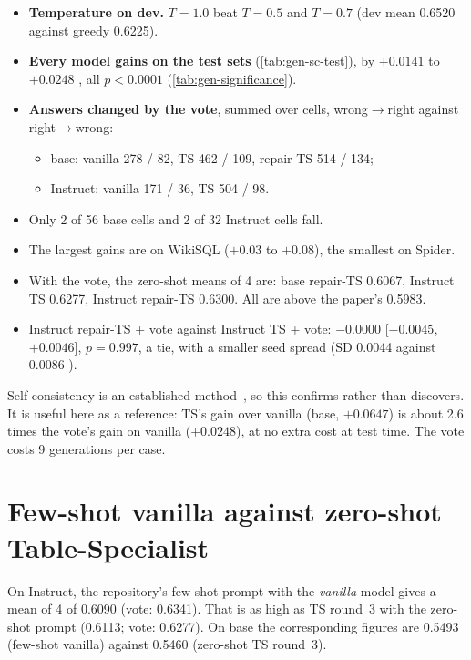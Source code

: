 \begin{observation}
\begin{itemize}
\item \textbf{Temperature on dev.} $T=1.0$ beat $T=0.5$ and $T=0.7$ (dev mean 0.6520 against greedy 0.6225).
\item \textbf{Every model gains on the test sets} (\cref{tab:gen-sc-test}), by $+0.0141$ to $+0.0248$ \Mviii{}, all
$p<0.0001$ (\cref{tab:gen-significance}).
\item \textbf{Answers changed by the vote}, summed over cells, wrong$\to$right against right$\to$wrong:
  \begin{itemize}
  \item base: vanilla 278 / 82, TS 462 / 109, repair-TS 514 / 134;
  \item Instruct: vanilla 171 / 36, TS 504 / 98.
  \end{itemize}
\item Only 2 of 56 base cells and 2 of 32 Instruct cells fall.
\item The largest gains are on WikiSQL ($+0.03$ to $+0.08$), the smallest on Spider.
\item With the vote, the zero-shot means of 4 are: base repair-TS 0.6067, Instruct TS 0.6277, Instruct repair-TS
0.6300. All are above the paper's 0.5983.
\item Instruct repair-TS + vote against Instruct TS + vote: $-0.0000$ [$-0.0045$, $+0.0046$], $p=0.997$, a tie, with a
smaller seed spread (SD 0.0044 against 0.0086 \Mviii{}).
\end{itemize}
\end{observation}

\begin{interpretation}
Self-consistency is an established method~\cite{wang2022selfconsistency}, so this confirms rather than discovers. It is
useful here as a reference: TS's gain over vanilla (base, \Mviii{} $+0.0647$) is about 2.6 times the vote's gain on
vanilla ($+0.0248$), at no extra cost at test time. The vote costs 9 generations per case.
\end{interpretation}

\section{Few-shot vanilla against zero-shot Table-Specialist}\label{sec:ext-fewshot}

\begin{observation}
On Instruct, the repository's few-shot prompt with the \emph{vanilla} model gives a mean of 4 of 0.6090 (vote: 0.6341).
That is as high as TS round~3 with the zero-shot prompt (0.6113; vote: 0.6277). On base the corresponding figures are
0.5493 (few-shot vanilla) against 0.5460 (zero-shot TS round~3).
\end{observation}

